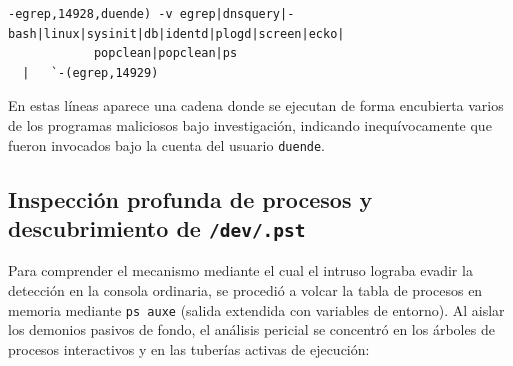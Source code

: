 \begin{lstlisting}[style=terminal]
-egrep,14928,duende) -v egrep|dnsquery|-bash|linux|sysinit|db|identd|plogd|screen|ecko|
            popclean|popclean|ps 
  |   `-(egrep,14929)
\end{lstlisting}

\vspace{1em}

 En estas líneas aparece una cadena donde se ejecutan de forma encubierta varios de los programas maliciosos bajo investigación, indicando inequívocamente que fueron invocados bajo la cuenta del usuario \texttt{duende}.

\subsection{Inspección profunda de procesos y descubrimiento de \texttt{/dev/.pst}}

Para comprender el mecanismo mediante el cual el intruso lograba evadir la detección en la consola ordinaria, se procedió a volcar la tabla de procesos en memoria mediante \texttt{ps auxe} (salida extendida con variables de entorno). Al aislar los demonios pasivos de fondo, el análisis pericial se concentró en los árboles de procesos interactivos y en las tuberías activas de ejecución:

